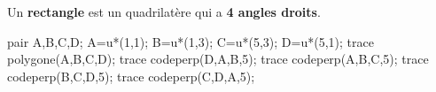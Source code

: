 \begin{changemargin}{-5mm}{-15mm}
    \begin{definition}        
        \begin{minipage}{0.6\linewidth}
            Un \textbf{rectangle} est un quadrilatère qui a \textbf{4 angles droits}.
        \end{minipage}
        \hfill
        \begin{minipage}{0.4\linewidth}
            \begin{center}
                \begin{Geometrie}
                    pair A,B,C,D;
                    A=u*(1,1);
                    B=u*(1,3);
                    C=u*(5,3);
                    D=u*(5,1);
                    trace polygone(A,B,C,D);
                    trace codeperp(D,A,B,5);
                    trace codeperp(A,B,C,5);
                    trace codeperp(B,C,D,5);
                    trace codeperp(C,D,A,5);
                \end{Geometrie} 
            \end{center}
        \end{minipage}
    \end{definition}
    

\end{changemargin}
